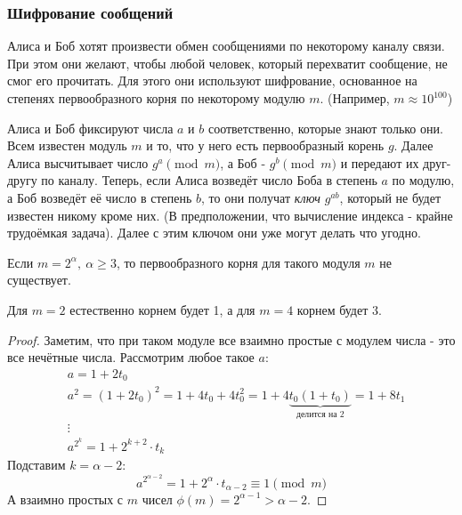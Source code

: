 \subsubsection*{Шифрование сообщений}

\begin{problem}
	Алиса и Боб хотят произвести обмен сообщениями по некоторому каналу связи. При этом они желают, чтобы любой человек, который перехватит сообщение, не смог его прочитать. Для этого они используют шифрование, основанное на степенях первообразного корня по некоторому модулю $m$. (Например, $m \approx 10^{100}$)
\end{problem}

\begin{solution}
	Алиса и Боб фиксируют числа $a$ и $b$ соответственно, которые знают только они. Всем известен модуль $m$ и то, что у него есть первообразный корень $g$. Далее Алиса высчитывает число $g^a \pmod m$, а Боб - $g^b \pmod m$ и передают их друг-другу по каналу. Теперь, если Алиса возведёт число Боба в степень $a$ по модулю, а Боб возведёт её число в степень $b$, то они получат \textit{ключ} $g^{ab}$, который не будет известен никому кроме них. (В предположении, что вычисление индекса - крайне трудоёмкая задача). Далее с этим ключом они уже могут делать что угодно.
\end{solution}

\begin{theorem}
	Если $m = 2^\alpha,\ \alpha \ge 3$, то первообразного корня для такого модуля $m$ не существует.
\end{theorem}

\begin{note}
	Для $m = 2$ естественно корнем будет 1, а для $m = 4$ корнем будет 3.
\end{note}

\begin{proof}
	Заметим, что при таком модуле все взаимно простые с модулем числа - это все нечётные числа. Рассмотрим любое такое $a$:
	\begin{align*}
		&{a = 1 + 2t_0}
		\\
		&{a^2 = (1 + 2t_0)^2 = 1 + 4t_0 + 4t_0^2 = 1 + 4\underbrace{t_0(1 + t_0)}_{\text{делится на } 2} = 1 + 8t_1}
		\\
		&{\vdots}
		\\
		&{a^{2^k} = 1 + 2^{k + 2} \cdot t_k}
	\end{align*}
	Подставим $k = \alpha - 2$:
	\[
		a^{2^{\alpha - 2}} = 1 + 2^{\alpha} \cdot t_{\alpha - 2} \equiv 1 \pmod m
	\]
	А взаимно простых с $m$ чисел $\phi(m) = 2^{\alpha - 1} > \alpha - 2$.
\end{proof}

